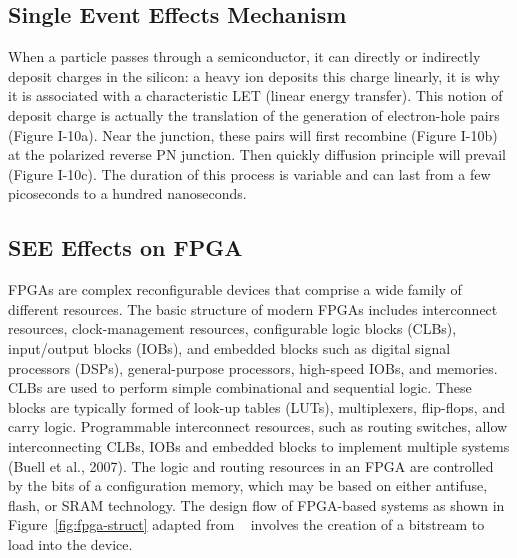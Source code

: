 \subsection{Single Event Effects Mechanism}


When a particle passes through a semiconductor, it can directly or indirectly deposit charges in the silicon: a heavy ion deposits this charge linearly, it is why it is associated with a characteristic LET (linear energy transfer). This notion of deposit
charge is actually the translation of the generation of electron-hole pairs (Figure I-10a). Near the junction, these
pairs will first recombine (Figure I-10b) at the polarized reverse PN junction.  Then quickly diffusion principle will prevail (Figure I-10c). The duration of this
process is variable and can last from a few picoseconds to a hundred
nanoseconds.


\subsection{SEE Effects on FPGA}



FPGAs are complex reconfigurable devices that comprise a wide family of different resources. The basic structure of modern FPGAs includes interconnect resources, clock-management resources, configurable logic blocks (CLBs), input/output
blocks (IOBs), and embedded blocks such as digital signal processors (DSPs), general-purpose processors, high-speed IOBs, and memories. CLBs are used to perform simple
combinational and sequential logic. These blocks are typically formed of look-up tables
(LUTs), multiplexers, flip-flops, and carry logic. Programmable interconnect resources, such
as routing switches, allow interconnecting CLBs, IOBs and embedded blocks to implement multiple systems (Buell et al., 2007).
The logic and routing resources in an FPGA are controlled by the bits of a configuration memory, which may be based on either antifuse, flash, or SRAM technology. The
design flow of FPGA-based systems as shown in Figure~\ref{fig:fpga-struct} adapted from ~\cite{hauck2010reconfigurable} involves the creation of a bitstream to load into the
device.



